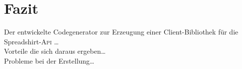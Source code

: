 \section{Fazit}
\label{sec:conclusion}

Der entwickelte Codegenerator zur Erzeugung einer Client-Bibliothek für die Spreadshirt-\textsc{Api} \ldots\\
Vorteile die sich daraus ergeben\ldots\\
Probleme bei der Erstellung\ldots

